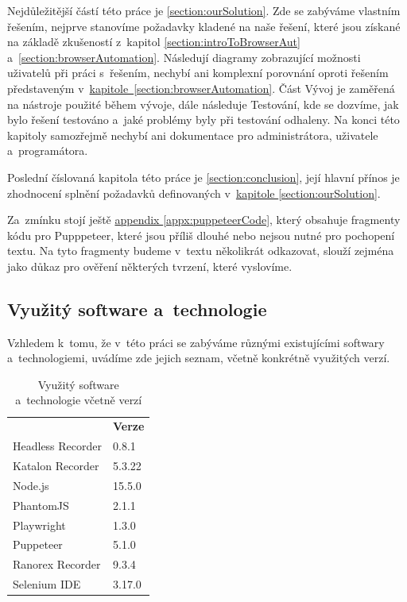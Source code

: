 \documentclass[12pt, a4paper, twoside]{article}
\newcommand*{\fullNameref}[1]{\hyperref[{#1}]{\ref{#1}~\nameref{#1}}}
\begin{document}
	Nejdůležitější částí této práce je \cref{section:ourSolution}. Zde se zabýváme vlastním řešením, nejprve stanovíme požadavky kladené na naše řešení, které jsou získané na základě zkušeností z~kapitol \ref{section:introToBrowserAut} a~\ref{section:browserAutomation}. Následují diagramy zobrazující možnosti uživatelů při práci s~řešením, nechybí ani komplexní porovnání oproti řešením představeným v~\hyperref[section:browserAutomation]{kapitole~\ref{section:browserAutomation}}. Část Vývoj je zaměřená na nástroje použité během vývoje, dále následuje Testování, kde se dozvíme, jak bylo řešení testováno a~jaké problémy byly při testování odhaleny. Na konci této kapitoly samozřejmě nechybí ani dokumentace pro administrátora, uživatele a~programátora.

	Poslední číslovaná kapitola této práce je \cref{section:conclusion}, její hlavní přínos je zhodnocení splnění požadavků definovaných v~\hyperref[section:ourSolution]{kapitole \ref{section:ourSolution}}.
	
	Za~zmínku stojí ještě \hyperref[appx:puppeteerCode]{appendix \ref{appx:puppeteerCode}}, který obsahuje fragmenty kódu pro Pupppeteer, které jsou příliš dlouhé nebo nejsou nutné pro pochopení textu. Na tyto fragmenty budeme v~textu několikrát odkazovat, slouží zejména jako důkaz pro ověření některých tvrzení, které vyslovíme.
	
	\subsection{Využitý software a~technologie}
	Vzhledem k~tomu, že v~této práci se zabýváme různými existujícími softwary a~technologiemi, uvádíme zde jejich seznam, včetně konkrétně využitých verzí.
	\begin{table}[H]
	\centering
	\begin{tabular}{ l|l } 
		\rowcolor{tableHeadingBackground}
		\multicolumn{1}{l}{\textbf{Název}} & \multicolumn{1}{l}{\textbf{Verze}} \\
		Headless Recorder & 0.8.1 \\ 
		Katalon Recorder & 5.3.22 \\ 
		Node.js & 15.5.0\\
		PhantomJS & 2.1.1 \\
		Playwright & 1.3.0  \\
		Puppeteer & 5.1.0 \\
		Ranorex Recorder & 9.3.4 \\
		Selenium IDE & 3.17.0 \\
	\end{tabular}
	\caption{Využitý software a~technologie včetně verzí}
	\label{tab:usedSoftware}
\end{table}
\end{document}
